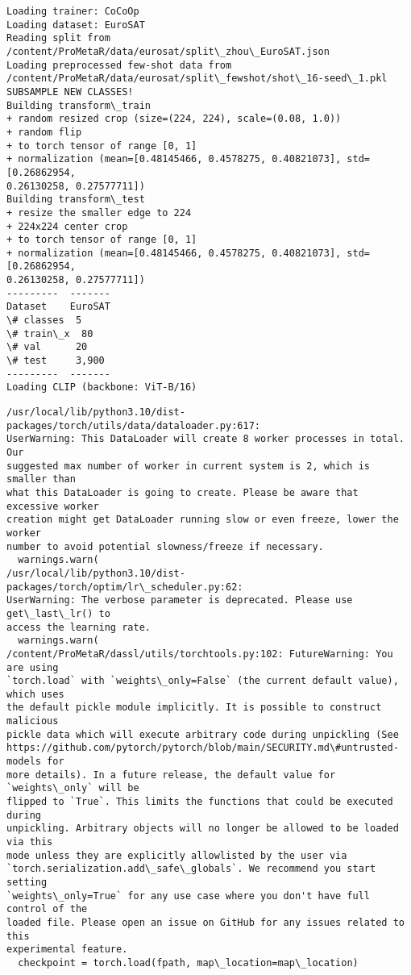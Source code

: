 \documentclass[11pt]{article}
\begin{document}
    \begin{Verbatim}[commandchars=\\\{\}]
Loading trainer: CoCoOp
Loading dataset: EuroSAT
Reading split from /content/ProMetaR/data/eurosat/split\_zhou\_EuroSAT.json
Loading preprocessed few-shot data from
/content/ProMetaR/data/eurosat/split\_fewshot/shot\_16-seed\_1.pkl
SUBSAMPLE NEW CLASSES!
Building transform\_train
+ random resized crop (size=(224, 224), scale=(0.08, 1.0))
+ random flip
+ to torch tensor of range [0, 1]
+ normalization (mean=[0.48145466, 0.4578275, 0.40821073], std=[0.26862954,
0.26130258, 0.27577711])
Building transform\_test
+ resize the smaller edge to 224
+ 224x224 center crop
+ to torch tensor of range [0, 1]
+ normalization (mean=[0.48145466, 0.4578275, 0.40821073], std=[0.26862954,
0.26130258, 0.27577711])
---------  -------
Dataset    EuroSAT
\# classes  5
\# train\_x  80
\# val      20
\# test     3,900
---------  -------
Loading CLIP (backbone: ViT-B/16)
    \end{Verbatim}

    \begin{Verbatim}[commandchars=\\\{\}]
/usr/local/lib/python3.10/dist-packages/torch/utils/data/dataloader.py:617:
UserWarning: This DataLoader will create 8 worker processes in total. Our
suggested max number of worker in current system is 2, which is smaller than
what this DataLoader is going to create. Please be aware that excessive worker
creation might get DataLoader running slow or even freeze, lower the worker
number to avoid potential slowness/freeze if necessary.
  warnings.warn(
/usr/local/lib/python3.10/dist-packages/torch/optim/lr\_scheduler.py:62:
UserWarning: The verbose parameter is deprecated. Please use get\_last\_lr() to
access the learning rate.
  warnings.warn(
/content/ProMetaR/dassl/utils/torchtools.py:102: FutureWarning: You are using
`torch.load` with `weights\_only=False` (the current default value), which uses
the default pickle module implicitly. It is possible to construct malicious
pickle data which will execute arbitrary code during unpickling (See
https://github.com/pytorch/pytorch/blob/main/SECURITY.md\#untrusted-models for
more details). In a future release, the default value for `weights\_only` will be
flipped to `True`. This limits the functions that could be executed during
unpickling. Arbitrary objects will no longer be allowed to be loaded via this
mode unless they are explicitly allowlisted by the user via
`torch.serialization.add\_safe\_globals`. We recommend you start setting
`weights\_only=True` for any use case where you don't have full control of the
loaded file. Please open an issue on GitHub for any issues related to this
experimental feature.
  checkpoint = torch.load(fpath, map\_location=map\_location)
    \end{Verbatim}
\end{document}
